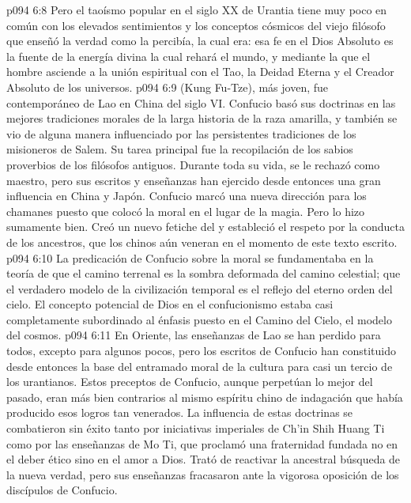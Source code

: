\vs p094 6:8 Pero el taoísmo popular en el siglo XX de Urantia tiene muy poco en común con los elevados sentimientos y los conceptos cósmicos del viejo filósofo que enseñó la verdad como la percibía, la cual era: esa fe en el Dios Absoluto es la fuente de la energía divina la cual rehará el mundo, y mediante la que el hombre asciende a la unión espiritual con el Tao, la Deidad Eterna y el Creador Absoluto de los universos.
\vs p094 6:9 \pc {} (Kung Fu\hyp{}Tze), más joven, fue contemporáneo de Lao en China del siglo VI. Confucio basó sus doctrinas en las mejores tradiciones morales de la larga historia de la raza amarilla, y también se vio de alguna manera influenciado por las persistentes tradiciones de los misioneros de Salem. Su tarea principal fue la recopilación de los sabios proverbios de los filósofos antiguos. Durante toda su vida, se le rechazó como maestro, pero sus escritos y enseñanzas han ejercido desde entonces una gran influencia en China y Japón. Confucio marcó una nueva dirección para los chamanes puesto que colocó la moral en el lugar de la magia. Pero lo hizo sumamente bien. Creó un nuevo fetiche del  y estableció el respeto por la conducta de los ancestros, que los chinos aún veneran en el momento de este texto escrito.
\vs p094 6:10 La predicación de Confucio sobre la moral se fundamentaba en la teoría de que el camino terrenal es la sombra deformada del camino celestial; que el verdadero modelo de la civilización temporal es el reflejo del eterno orden del cielo. El concepto potencial de Dios en el confucionismo estaba casi completamente subordinado al énfasis puesto en el Camino del Cielo, el modelo del cosmos.
\vs p094 6:11 En Oriente, las enseñanzas de Lao se han perdido para todos, excepto para algunos pocos, pero los escritos de Confucio han constituido desde entonces la base del entramado moral de la cultura para casi un tercio de los urantianos. Estos preceptos de Confucio, aunque perpetúan lo mejor del pasado, eran más bien contrarios al mismo espíritu chino de indagación que había producido esos logros tan venerados. La influencia de estas doctrinas se combatieron sin éxito tanto por iniciativas imperiales de Ch'in Shih Huang Ti como por las enseñanzas de Mo Ti, que proclamó una fraternidad fundada no en el deber ético sino en el amor a Dios. Trató de reactivar la ancestral búsqueda de la nueva verdad, pero sus enseñanzas fracasaron ante la vigorosa oposición de los discípulos de Confucio.
